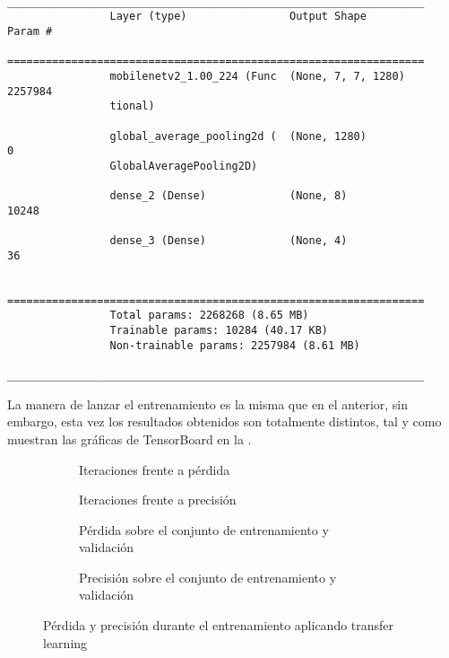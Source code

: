 			\begin{verbatim}
				_________________________________________________________________
				Layer (type)                Output Shape              Param #   
				=================================================================
				mobilenetv2_1.00_224 (Func  (None, 7, 7, 1280)        2257984   
				tional)                                                         
				
				global_average_pooling2d (  (None, 1280)              0         
				GlobalAveragePooling2D)                                         
				
				dense_2 (Dense)             (None, 8)                 10248     
				
				dense_3 (Dense)             (None, 4)                 36        
				
				=================================================================
				Total params: 2268268 (8.65 MB)
				Trainable params: 10284 (40.17 KB)
				Non-trainable params: 2257984 (8.61 MB)
				_________________________________________________________________
			\end{verbatim}
			
			La manera de lanzar el entrenamiento es la misma que en el anterior, sin embargo, esta vez los resultados obtenidos son totalmente distintos, tal y como muestran las gráficas de TensorBoard en la . \\
			
			\begin{figure}[!h]
				\centering
				\begin{subfigure}{.4\textwidth}
					\centering
					
					\caption{Iteraciones frente a pérdida}
					\label{fig:tb_tl_a}
				\end{subfigure}\hfill
				\begin{subfigure}{.4\textwidth}
					\centering
					
					\caption{Iteraciones frente a precisión}
					\label{fig:tb_tl_b}
				\end{subfigure}
				\begin{subfigure}{.4\textwidth}
					\centering
					
					\caption{Pérdida sobre el conjunto de entrenamiento y validación}
					\label{fig:tb_tl_c}
				\end{subfigure}\hfill
				\begin{subfigure}{.4\textwidth}
					\centering
					
					\caption{Precisión sobre el conjunto de entrenamiento y validación}
					\label{fig:tb_tl_d}
				\end{subfigure}
				\caption{Pérdida y precisión durante el entrenamiento aplicando transfer learning}
				\label{fig:tb_tl}
			\end{figure}
			
